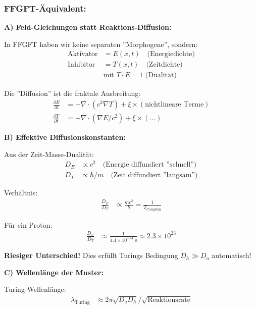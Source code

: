 \documentclass[12pt,a4paper]{article}
\begin{document}
	\subsubsection*{FFGFT-Äquivalent:}
	
	\textbf{A) Feld-Gleichungen statt Reaktions-Diffusion:}
	
	In FFGFT haben wir keine separaten ''Morphogene'', sondern:
	\begin{align*}
		\text{Aktivator} &= E(x,t) \quad \text{(Energiedichte)} \\
		\text{Inhibitor} &= T(x,t) \quad \text{(Zeitdichte)} \\
		&\text{mit } T \cdot E = 1 \text{ (Dualität)}
	\end{align*}
	
	Die ''Diffusion'' ist die fraktale Ausbreitung:
	\begin{align*}
		\frac{\partial E}{\partial t} &= -\nabla \cdot (c^2 \nabla T) + \xi \times (\text{nichtlineare Terme}) \\
		\frac{\partial T}{\partial t} &= -\nabla \cdot (\nabla E/c^2) + \xi \times (\dots)
	\end{align*}
	
	\textbf{B) Effektive Diffusionskonstanten:}
	
	Aus der Zeit-Masse-Dualität:
	\begin{align*}
		D_E &\propto c^2 \quad \text{(Energie diffundiert ''schnell'')} \\
		D_T &\propto \hbar/m \quad \text{(Zeit diffundiert ''langsam'')}
	\end{align*}
	
	Verhältnis:
	\begin{align*}
		\frac{D_E}{D_T} &\propto \frac{m c^2}{\hbar} = \frac{1}{T_{\text{Compton}}}
	\end{align*}
	
	Für ein Proton:
	\begin{align*}
		\frac{D_E}{D_T} &\approx \frac{1}{4.4 \times 10^{-24} \text{ s}} \approx 2.3 \times 10^{23}
	\end{align*}
	
	\textbf{Riesiger Unterschied!} Dies erfüllt Turings Bedingung $D_h \gg D_a$ automatisch!
	
	\textbf{C) Wellenlänge der Muster:}
	
	Turing-Wellenlänge:
	\begin{align*}
		\lambda_{\text{Turing}} &\approx 2\pi \sqrt{D_a D_h} / \sqrt{\text{Reaktionsrate}}
	\end{align*}
	
\end{document}
